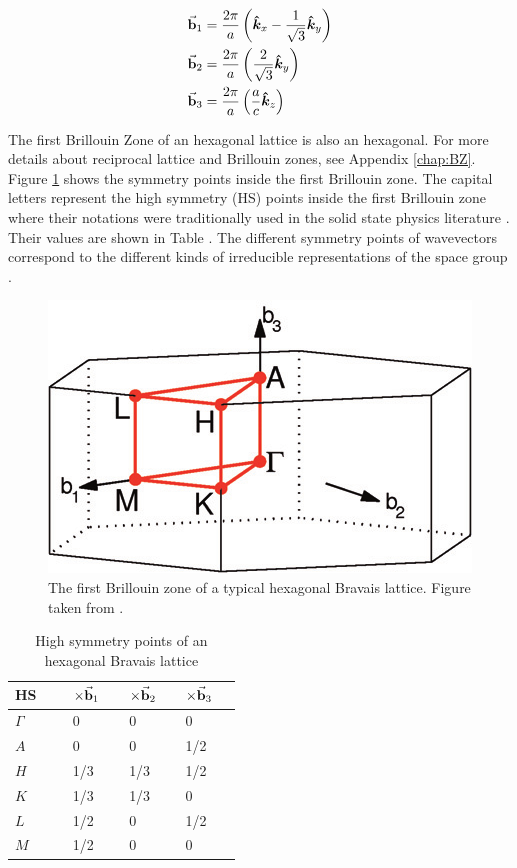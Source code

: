 \begin{align}
	\va{b}_1 & = \frac{2 \pi}{a} \left(\vu*{k}_x - \frac{1}{\sqrt{3}} \vu*{k}_y \right) \\
	\va{b}_2 & = \frac{2 \pi}{a} \left( \frac{2}{\sqrt{3}} \vu*{k}_y \right)            \\
	\va{b}_3 & = \frac{2 \pi}{a} \left( \frac{a}{c} \vu*{k}_z  \right)
\end{align}

The first Brillouin Zone of an hexagonal lattice is also an hexagonal. For more details about reciprocal lattice and Brillouin zones, see Appendix \ref{chap:BZ}.  Figure \ref{fig:HS} shows the symmetry points inside the first Brillouin zone. The capital letters represent the high symmetry (HS) points inside the first Brillouin zone where their notations were traditionally used in the solid state physics literature \citep{Bouckaert1936}. Their  values are shown in Table .  The different symmetry points of wavevectors correspond to the different kinds of irreducible representations of the space group \citep{Shmueli2001,Aroyo2006,PerezMato2011,Aroyo2014}.

\begin{figure}[tbh!]
	\centering
	\includegraphics[width=0.48\linewidth]{"images/rrl/hex"}
	\caption[The first Brillouin zone of a typical hexagonal Bravais lattice]{The first Brillouin zone of a typical hexagonal Bravais lattice. Figure taken from \citep{Setyawan2010}.}
	\label{fig:HS}
\end{figure}



\begin{table}[tbh!]
	\centering
	\caption{High symmetry points of an hexagonal Bravais lattice}
	\label{tab:HS}
	\begin{tabular}[t]{K{0.15\linewidth}K{0.1\linewidth}K{0.1\linewidth}K{0.1\linewidth}}
		\toprule
		\textbf{HS} & $\times \va{b}_1$ & $\times \va{b}_2$ & $\times \va{b}_3$ \\ \midrule
		$\Gamma$    & 0                 & 0                 & 0                 \\
		$A$         & 0                 & 0                 & 1/2               \\
		$H$         & 1/3               & 1/3               & 1/2               \\
		$K$         & 1/3               & 1/3               & 0                 \\
		$L$         & 1/2               & 0                 & 1/2               \\
		$M$         & 1/2               & 0                 & 0                 \\ \bottomrule
	\end{tabular}%
\end{table}

